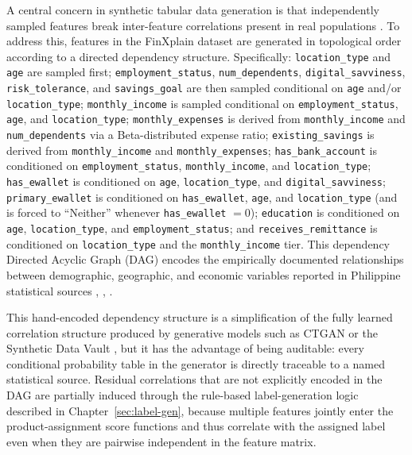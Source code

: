 \documentclass[journal]{./IEEE/IEEEtran}
\begin{document}
A central concern in synthetic tabular data generation is that independently sampled features break inter-feature correlations present in real populations \cite{ref29}. To address this, features in the FinXplain dataset are generated in topological order according to a directed dependency structure. Specifically: \texttt{location\_type} and \texttt{age} are sampled first; \texttt{employment\_status}, \texttt{num\_dependents}, \texttt{digital\_savviness}, \texttt{risk\_tolerance}, and \texttt{savings\_goal} are then sampled conditional on \texttt{age} and/or \texttt{location\_type}; \texttt{monthly\_income} is sampled conditional on \texttt{employment\_status}, \texttt{age}, and \texttt{location\_type}; \texttt{monthly\_expenses} is derived from \texttt{monthly\_income} and \texttt{num\_dependents} via a Beta-distributed expense ratio; \texttt{existing\_savings} is derived from \texttt{monthly\_income} and \texttt{monthly\_expenses}; \texttt{has\_bank\_account} is conditioned on \texttt{employment\_status}, \texttt{monthly\_income}, and \texttt{location\_type}; \texttt{has\_ewallet} is conditioned on \texttt{age}, \texttt{location\_type}, and \texttt{digital\_savviness}; \texttt{primary\_ewallet} is conditioned on \texttt{has\_ewallet}, \texttt{age}, and \texttt{location\_type} (and is forced to ``Neither'' whenever \texttt{has\_ewallet} $=0$); \texttt{education} is conditioned on \texttt{age}, \texttt{location\_type}, and \texttt{employment\_status}; and \texttt{receives\_remittance} is conditioned on \texttt{location\_type} and the \texttt{monthly\_income} tier. This dependency Directed Acyclic Graph (DAG) encodes the empirically documented relationships between demographic, geographic, and economic variables reported in Philippine statistical sources \cite{ref35}, \cite{ref40}, \cite{ref66}.

This hand-encoded dependency structure is a simplification of the fully learned correlation structure produced by generative models such as CTGAN \cite{ref34} or the Synthetic Data Vault \cite{ref29}, but it has the advantage of being auditable: every conditional probability table in the generator is directly traceable to a named statistical source. Residual correlations that are not explicitly encoded in the DAG are partially induced through the rule-based label-generation logic described in Chapter~\ref{sec:label-gen}, because multiple features jointly enter the product-assignment score functions and thus correlate with the assigned label even when they are pairwise independent in the feature matrix.
\end{document}
